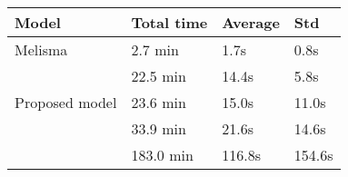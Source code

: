 \begin{tabular}{l|lll}
    Model                        & Total time & Average & Std    \\
    \hline
    Melisma                      & 2.7 min    & 1.7s    & 0.8s   \\
    \textcite{chen2021attend}    & 22.5 min   & 14.4s   & 5.8s   \\
    Proposed model               & 23.6 min   & 15.0s   & 11.0s  \\
    \textcite{micchi2021deep}    & 33.9 min   & 21.6s   & 14.6s  \\
    \textcite{mcleod2021modular} & 183.0 min  & 116.8s  & 154.6s \\
\end{tabular}
